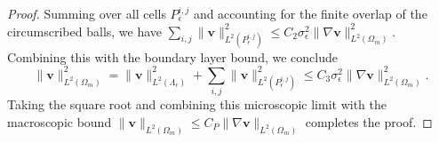 \documentclass[10pt,a4paper]{amsart}
\begin{document}
\begin{proof}
    Summing over all cells $P_\epsilon^{i,j}$ and accounting for the finite overlap of the circumscribed balls, we have $\sum_{i,j} \|\mathbf{v}\|_{L^2(P_\epsilon^{i,j})}^2 \le C_2 \sigma_{\epsilon}^2 \|\nabla \mathbf{v}\|_{L^2(\Omega_m)}^2$. Combining this with the boundary layer bound, we conclude
    \begin{equation}
        \|\mathbf{v}\|_{L^2(\Omega_m)}^2 = \|\mathbf{v}\|_{L^2(\Lambda_{\epsilon})}^2 + \sum_{i,j} \|\mathbf{v}\|_{L^2(P_\epsilon^{i,j})}^2 \le C_3 \sigma_{\epsilon}^2 \|\nabla \mathbf{v}\|_{L^2(\Omega_m)}^2.
    \end{equation}
    Taking the square root and combining this microscopic limit with the macroscopic bound $\|\mathbf{v}\|_{L^2(\Omega_m)} \le C_P \|\nabla \mathbf{v}\|_{L^2(\Omega_m)}$ completes the proof.
\end{proof}
\end{document}
